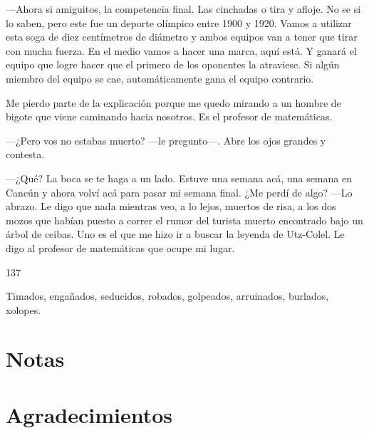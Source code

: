 \documentclass[12pt,twoside,openright,a5paper]{book}
\begin{document}
---Ahora si amiguitos, la competencia final. Las cinchadas o tira y afloje. No
se si lo saben, pero este fue un deporte olímpico entre 1900 y 1920. Vamos a
utilizar esta soga de diez centímetros de diámetro y ambos equipos van a tener que tirar
con mucha fuerza. En el medio vamos a hacer una marca, aquí está. Y ganará
el equipo que logre hacer que el primero de los oponentes la atraviese. Si
algún miembro del equipo se cae, automáticamente gana el equipo contrario.

Me pierdo parte de la explicación porque me quedo mirando a un
hombre de bigote que viene caminando hacia nosotros. Es el profesor de
matemáticas. 

---¿Pero vos no estabas muerto? ---le pregunto---. Abre los ojos
grandes y contesta. 

---¿Qué? La boca se te haga a un lado. Estuve una semana
acá, una semana en Cancún y ahora volví acá para pasar mi semana final. ¿Me
perdí de algo? ---Lo abrazo. Le digo que nada mientras veo, a lo lejos, muertos de risa,
a los dos mozos que habían puesto a correr el rumor del turista muerto
encontrado bajo un árbol de ceibas. Uno es el que me hizo ir a buscar la
leyenda de Utz-Colel. Le digo al profesor de matemáticas que ocupe mi lugar.

\vspace{0.5cm}

\hrulefill \hspace{0.1cm}\decofourleft\hspace{0.2cm} 137 \hspace{0.2cm}\decofourright \hspace{0.1cm}\hrulefill

\nopagebreak

\vspace{0.5cm}

\nopagebreak

Timados, engañados, seducidos, robados, golpeados, arruinados, burlados, xolopes.

\vspace{0.5cm}


\vspace{0.5cm}
\hrulefill\hspace{0.2cm} \decofourright\decofourleft \hspace{0.2cm} \hrulefill

\cleardoublepage



\cleardoublepage

\section*{Notas}



\cleardoublepage

\section*{Agradecimientos}


\end{document}
